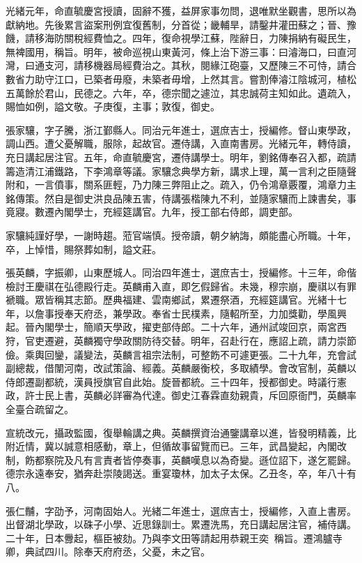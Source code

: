 \begin{pinyinscope}
光緒元年，命直毓慶宮授讀，固辭不獲，益屏家事勿問，退唯默坐觀書，思所以為獻納地。先後累言盜案刑例宜復舊制，分首從；畿輔旱，請鑿井灌田蘇之；晉、豫饑，請移海防關稅經費恤之。四年，復命視學江蘇，陛辭日，力陳捐納有礙民生，無裨國用，稱旨。明年，被命巡視山東黃河，條上治下游三事：曰濬海口，曰直河灣，曰通支河，請移機器局經費治之。其秋，閱緣江砲臺，又歷陳三不可恃，請合數省力助守江口，已築者毋廢，未築者毋增，上然其言。嘗割俸濬江陰城河，植松五萬餘於君山，民德之。六年，卒，德宗聞之遽泣，其忠誠荷主知如此。遺疏入，賜恤如例，謚文敬。子庚復，主事；敦復，御史。

張家驤，字子騰，浙江鄞縣人。同治元年進士，選庶吉士，授編修。督山東學政，調山西。遭父憂解職，服除，起故官。遷侍講，入直南書房。光緒元年，轉侍讀，充日講起居注官。五年，命直毓慶宮，遷侍講學士。明年，劉銘傳奉召入都，疏請籌造清江浦鐵路，下李鴻章等議。家驤念典學方新，講求上理，萬一言利之臣隨聲附和，一言僨事，關系匪輕，乃力陳三弊阻止之。疏入，仍令鴻章覈覆，鴻章力主銘傳策。然自是御史洪良品陳五害，侍講張楷陳九不利，並隨家驤而上諫書矣，事竟寢。數遷內閣學士，充經筵講官。九年，授工部右侍郎，調吏部。

家驤純謹好學，一謝時趨。蒞官端慎。授帝讀，朝夕納誨，頗能盡心所職。十年，卒，上悼惜，賜祭葬如制，謚文莊。

張英麟，字振卿，山東歷城人。同治四年進士，選庶吉士，授編修。十三年，命偕檢討王慶祺在弘德殿行走。英麟甫入直，即乞假歸省。未幾，穆宗崩，慶祺以有罪褫職。眾皆稱其志節。歷典福建、雲南鄉試，累遷祭酒，充經筵講官。光緒十七年，以詹事授奉天府丞，兼學政。奉省士民樸素，隨軺所至，力加獎勸，學風興起。晉內閣學士，簡順天學政，擢吏部侍郎。二十六年，通州試竣回京，兩宮西狩，官吏遷避，英麟獨守學政關防待交替。明年，召赴行在，應詔上疏，請力崇節儉。乘輿回鑾，議變法，英麟言祖宗法制，可整飭不可遽更張。二十九年，充會試副總裁，借闈河南，改試策論、經義。英麟嚴衡校，多取績學。會改官制，英麟以侍郎遷副都統，漢員授旗官自此始。旋晉都統。三十四年，授都御史。時議行憲政，許士民上書，英麟必詳審為代達。御史江春霖直劾親貴，斥回原衙門，英麟率全臺合疏留之。

宣統改元，攝政監國，復舉輪講之典。英麟撰資治通鑒講章以進，皆發明精義，比附近情，冀以誠意相感動，章上，但循故事留覽而已。三年，武昌變起，內閣改制，飭都察院及凡有言責者皆停奏事，英麟嘆息以為奇變。遜位詔下，遂乞罷歸。德宗永遠奉安，猶奔赴崇陵謁送。重宴瓊林，加太子太保。乙丑冬，卒，年八十有八。

張仁黼，字劭予，河南固始人。光緒二年進士，選庶吉士，授編修，入直上書房。出督湖北學政，以硃子小學、近思錄訓士。累遷洗馬，充日講起居注官，補侍講。二十年，日本釁起，樞臣被劾。乃與李文田等請起用恭親王奕，稱旨。遷鴻臚寺卿，典試四川。除奉天府府丞，父憂，未之官。


\end{pinyinscope}
